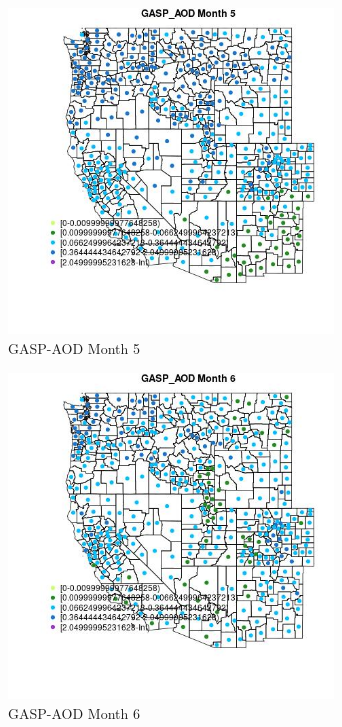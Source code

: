 \begin{figure} 
\centering  
\includegraphics[width=0.77\textwidth]{Code_Outputs/df_report_ML_predictors_CountyCentroid_Locations_Dates_2008-01-01to2018-12-31_MapObsMo5GASP_AOD.jpg} 
\caption{\label{fig:df_report_ML_predictors_CountyCentroid_Locations_Dates_2008-01-01to2018-12-31MapObsMo5GASP_AOD}GASP-AOD Month 5} 
\end{figure} 
 

\begin{figure} 
\centering  
\includegraphics[width=0.77\textwidth]{Code_Outputs/df_report_ML_predictors_CountyCentroid_Locations_Dates_2008-01-01to2018-12-31_MapObsMo6GASP_AOD.jpg} 
\caption{\label{fig:df_report_ML_predictors_CountyCentroid_Locations_Dates_2008-01-01to2018-12-31MapObsMo6GASP_AOD}GASP-AOD Month 6} 
\end{figure} 
 


